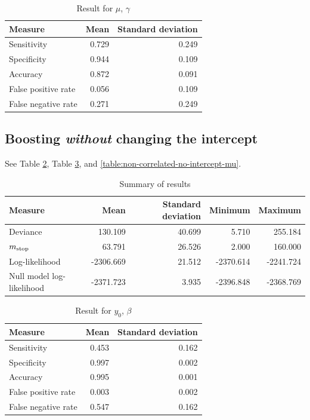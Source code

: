 \begin{table}\caption{Result for $\mu$, $\gamma$}\label{table:non-correlated-with-intercept-mu}
\begin{tabular}{l|rr}
Measure     & Mean   & Standard deviation     \\
\hline
Sensitivity & 0.729 & 0.249 \\
Specificity & 0.944 & 0.109 \\
Accuracy    & 0.872 & 0.091 \\
False positive rate         & 0.056 & 0.109 \\
False negative rate         & 0.271 & 0.249
\end{tabular}
\end{table}



\subsection{Boosting \textit{without} changing the intercept}
See Table \ref{table:non-correlated-no-intercept-summary}, Table \ref{table:non-correlated-no-intercept-y0}, and \ref{table:non-correlated-no-intercept-mu}.
\begin{table}\caption{Summary of results}\label{table:non-correlated-no-intercept-summary}
\begin{tabular}{l|rrrr}
Measure &    Mean &     Standard deviation &  Minimum & Maximum \\
\hline
Deviance    &   130.109 & 40.699 &     5.710 &   255.184 \\
$m_{\text{stop}}$      &    63.791 & 26.526 &     2.000 &   160.000 \\
Log-likelihood      & -2306.669 & 21.512 & -2370.614 & -2241.724 \\
Null model log-likelihood & -2371.723 &  3.935 & -2396.848 & -2368.769
\end{tabular}
\end{table}

\begin{table}\caption{Result for $y_0$, $\beta$}\label{table:non-correlated-no-intercept-y0}
\begin{tabular}{l|rr}
Measure &  Mean &    Standard deviation \\
\hline
Sensitivity & 0.453 & 0.162 \\
Specificity & 0.997 & 0.002 \\
Accuracy    & 0.995 & 0.001 \\
False positive rate         & 0.003 & 0.002 \\
False negative rate         & 0.547 & 0.162
\end{tabular}
\end{table}


